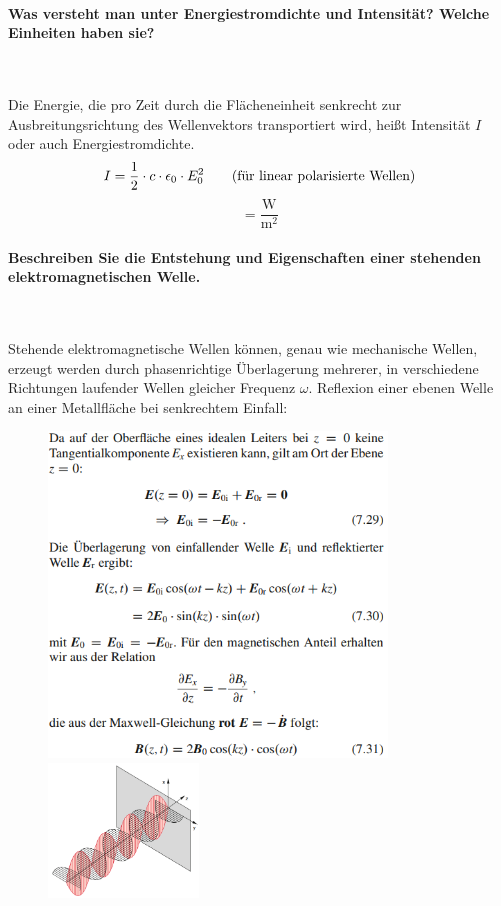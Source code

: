 \documentclass[a4paper, 11pt, ngerman, parskip=half-]{scrartcl}
\begin{document}
\paragraph{Was versteht man unter Energiestromdichte und Intensität? Welche Einheiten haben sie?} ~

Die Energie, die pro Zeit durch die Flächeneinheit senkrecht zur Ausbreitungsrichtung des
Wellenvektors transportiert wird, heißt Intensität $I$ oder auch Energiestromdichte.
\begin{equation}
    I = \frac{1}{2} \cdot c \cdot \epsilon_0 \cdot E_0^2 \qquad \text{(für linear polarisierte Wellen)} \\
\end{equation}
\begin{equation}
    [I] = \frac{\text{W}}{\text{m}^2}
\end{equation}

\paragraph{Beschreiben Sie die Entstehung und Eigenschaften einer stehenden elektromagnetischen Welle.} ~

Stehende elektromagnetische Wellen können, genau wie mechanische Wellen, erzeugt werden durch
phasenrichtige Überlagerung mehrerer, in verschiedene Richtungen laufender Wellen gleicher Frequenz
$\omega$.
Reflexion einer ebenen Welle an einer Metallfläche bei senkrechtem Einfall:
\begin{figure}[H]
    \centering
    \begin{minipage}[b]{0.3\textwidth}
        \centering
        \includegraphics[width=9cm]{image/13/5.png}
    \end{minipage}
    \hspace{5cm}
    \begin{minipage}[b]{0.3\textwidth}
        \centering
        \includegraphics[width=4cm]{image/13/6.png}
    \end{minipage}
\end{figure}
\end{document}
